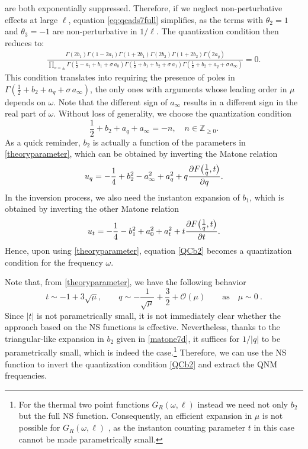 \documentclass[11pt]{article}
\numberwithin{equation}{section}
\begin{document}
are both exponentially suppressed. 
Therefore, if we neglect non-perturbative effects at large \(\ell\), equation \eqref{eq:qcads7full} simplifies, as the terms with \(\theta_2 = 1\) and \(\theta_3 = -1\) are non-perturbative in \(1/\ell\). The quantization condition then reduces to:
\begin{equation}\label{quantcondAdS7}
\begin{aligned}
\frac{\Gamma\left(2b_1\right)\Gamma\left(1-2a_t\right)\Gamma\left(1+2b_1\right)\Gamma\left(2b_2\right)\Gamma\left(1+2b_2\right)\Gamma\left(2a_{q}\right)}{\prod_{\sigma=\pm}\Gamma\left(\frac{1}{2}-a_t+b_1+\sigma\,a_0\right)\Gamma\left(\frac{1}{2}+b_1+b_2+\sigma\,a_1\right)\Gamma\left(\frac{1}{2}+b_2+a_{q}+\sigma\,a_{\infty}\right)}=0.
\end{aligned}
\end{equation}
This condition translates into requiring the presence of poles in  $\Gamma\left(\frac{1}{2}+b_2+a_{q}+\sigma\,a_{\infty}\right)$, the only ones with arguments whose leading order in $\mu$ depends on $\omega$. Note that the different sign of $a_{\infty}$ results in a different sign in the real part of $\omega$. Without loss of generality, we choose the quantization condition
\begin{equation}\label{QCb2}
\frac{1}{2}+b_2+a_{q}+a_{\infty}=-n,\quad n\in\mathbb{Z}_{\ge 0}.
\end{equation}
%
As a quick reminder, $b_2$ is actually a function of the parameters in \eqref{theoryparameter}, which can be obtained by inverting the Matone relation
\begin{equation}
u_{q}=-\frac{1}{4}+b_2^2-a_{\infty}^2+a_{q}^2+q\frac{\partial F\big({1\over q},t\big)}{\partial q}.
\end{equation}
In the inversion process, we also need the instanton expansion of $b_1$, which is obtained by inverting the other Matone relation
\begin{equation}
u_{t}=-\frac{1}{4}- b_1^2 + a_0^2 + a_t^2+t\frac{\partial F\big({1\over q},t\big)}{\partial t}.
\end{equation}
Hence, upon using \eqref{theoryparameter}, equation \eqref{QCb2} becomes a quantization condition for the frequency $\omega$. 

%
Note that, from \eqref{theoryparameter}, we have the following behavior
\begin{equation}
t\sim -1+3\sqrt{\mu},\quad\quad q\sim -\frac{1}{\sqrt{\mu}}+\frac{3}{2}+\mathcal{O}\left(\mu\right)\quad\quad\text{as}\quad \mu\sim 0~.
\end{equation}
Since  $|t|$  is not parametrically small, it is not immediately clear whether the approach based on the NS functions is effective. Nevertheless, thanks to the triangular-like expansion in  $b_2$  given in \eqref{matone7d}, it suffices for  $1/|q|$   to be parametrically small, which is indeed the case.\footnote{For the thermal two point functions $G_R(\omega, \ell)$ instead we need not only $b_2$ but the full NS function. 
Consequently, an efficient expansion in  $\mu$  is not possible for  $G_R(\omega, \ell)$ , as the instanton counting parameter  $t$ in this case  cannot be made parametrically small.} Therefore, we can use the NS function to invert the quantization condition \eqref{QCb2} and extract the QNM frequencies.
\end{document}
